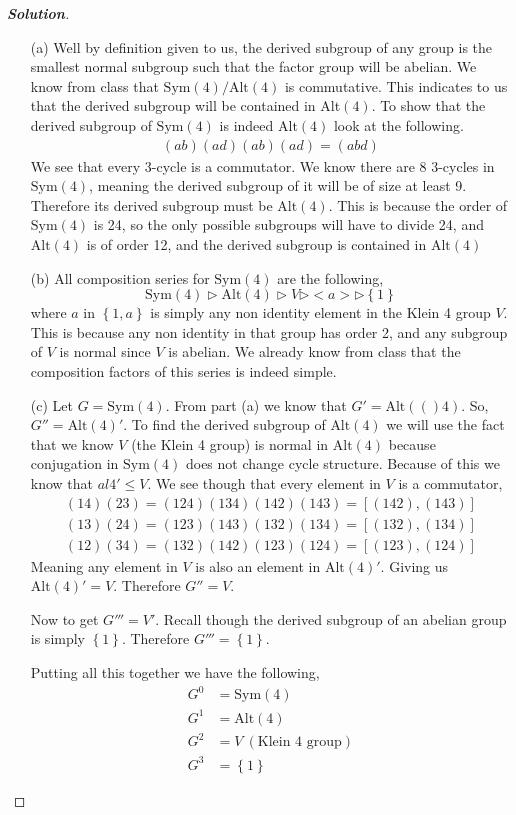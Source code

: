 \documentclass[11pt]{article}
\newenvironment{solution}{\begin{proof}[\textbf{\textit{Solution}}] }{\end{proof}}
\newcommand{\set}[1]{\left\{#1\right\}} %
\newcommand{\sy}[1]{\text{Sym}(#1)}
\newcommand{\al}[1]{\text{Alt}(#1)}
\renewcommand{\leq}{\leqslant}
\begin{document}
\begin{solution}
    \begin{itemize}
        \item[(a)] Well by definition given to us, the derived subgroup of any group is the smallest normal subgroup such that the factor group will be abelian. We know from class that $\text{Sym}(4)/\text{Alt}(4)$ is commutative. This indicates to us that the derived subgroup will be contained in Alt$(4)$. To show that the derived subgroup of $\sy{4}$ is indeed $\al{4}$ look at the following.
        \begin{align*}
            (ab)(ad)(ab)(ad) = (abd)
        \end{align*} 
        We see that every 3-cycle is a commutator. We know there are 8 3-cycles in $\sy{4}$, meaning the derived subgroup of it will be of size at least 9. Therefore its derived subgroup must be $\al{4}$. This is because the order of $\sy{4}$ is 24, so the only possible subgroups will have to divide 24, and $\al4$ is of order 12, and the derived subgroup is contained in $\al{4}$
        \item[(b)] All composition series for $\sy4$ are the following, \[\sy4 \rhd \al4 \rhd V \rhd <a>\rhd \set{1}\] where $a$ in $\set{1, a}$ is simply any non identity element in the Klein 4 group $V$. This is because any non identity in that group has order 2, and any subgroup of $V$ is normal since $V$ is abelian. We already know from class that the composition factors of this series is indeed simple. 
        \item[(c)]  Let $G = \sy4$. From part (a) we know that $G' = \al(4)$. So, $G'' = \al4'$. To find the derived subgroup of $\al4$ we will use the fact that we know $V$ (the Klein 4 group) is normal in $\al4$ because conjugation in $\sy4$ does not change cycle structure. Because of this we know that $al4' \leq V$. We see though that every element in $V$ is a commutator,
        \begin{align*}
            (14)(23) = (124)(134)(142)(143) = [(142),(143)] \\
            (13)(24) = (123)(143)(132)(134) = [(132),(134)] \\
            (12)(34) = (132)(142)(123)(124) = [(123),(124)]
        \end{align*} 
        Meaning any element in $V$ is also an element in $\al4'$. Giving us $\al4' = V$. Therefore $G'' = V$. 

        Now to get $G''' = V'$. Recall though the derived subgroup of an abelian group is simply $\set{1}$. Therefore $G''' = \set{1}$. 

        Putting all this together we have the following, 
        \begin{align*}
            G^0 &= \sy4 \\
            G^1 &= \al4 \\
            G^2 &= V\ (\text{Klein 4 group})\\
            G^3 &= \set{1}
        \end{align*}
    \end{itemize}
\end{solution}
\end{document}
